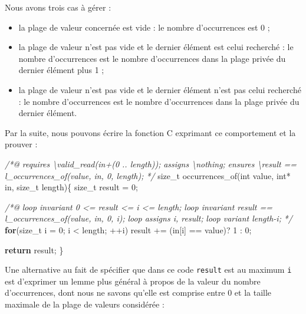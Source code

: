 \documentclass[12pt,francais,]{scrbook}
\newenvironment{Shaded}{}{}
\newcommand{\KeywordTok}[1]{\textcolor[rgb]{0.00,0.44,0.13}{\textbf{{#1}}}}
\newcommand{\DataTypeTok}[1]{\textcolor[rgb]{0.56,0.13,0.00}{{#1}}}
\newcommand{\DecValTok}[1]{\textcolor[rgb]{0.25,0.63,0.44}{{#1}}}
\newcommand{\CommentTok}[1]{\textcolor[rgb]{0.38,0.63,0.69}{\textit{{#1}}}}
\newcommand{\NormalTok}[1]{{#1}}
\providecommand{\tightlist}{%
  \setlength{\itemsep}{0pt}\setlength{\parskip}{0pt}}
\begin{document}
Nous avons trois cas à gérer :

\begin{itemize}
\tightlist
\item
  la plage de valeur concernée est vide : le nombre d'occurrences est 0
  ;
\item
  la plage de valeur n'est pas vide et le dernier élément est celui
  recherché : le nombre d'occurrences est le nombre d'occurrences dans
  la plage privée du dernier élément plus 1 ;
\item
  la plage de valeur n'est pas vide et le dernier élément n'est pas
  celui recherché : le nombre d'occurrences est le nombre d'occurrences
  dans la plage privée du dernier élément.
\end{itemize}

Par la suite, nous pouvons écrire la fonction C exprimant ce
comportement et la prouver :

\begin{footnotesize}\begin{Shaded}
\begin{Highlighting}[]
\CommentTok{/*@}
\CommentTok{  requires \textbackslash{}valid_read(in+(0 .. length));}
\CommentTok{  assigns  \textbackslash{}nothing;}
\CommentTok{  ensures  \textbackslash{}result == l_occurrences_of(value, in, 0, length);}
\CommentTok{*/}
\NormalTok{size_t occurrences_of(}\DataTypeTok{int} \NormalTok{value, }\DataTypeTok{int}\NormalTok{* in, size_t length)\{}
  \NormalTok{size_t result = }\DecValTok{0}\NormalTok{;}
  
  \CommentTok{/*@}
\CommentTok{    loop invariant 0 <= result <= i <= length;}
\CommentTok{    loop invariant result == l_occurrences_of(value, in, 0, i);}
\CommentTok{    loop assigns i, result;}
\CommentTok{    loop variant length-i;}
\CommentTok{  */}
  \KeywordTok{for}\NormalTok{(size_t i = }\DecValTok{0}\NormalTok{; i < length; ++i)}
    \NormalTok{result += (in[i] == value)? }\DecValTok{1} \NormalTok{: }\DecValTok{0}\NormalTok{;}

  \KeywordTok{return} \NormalTok{result;}
\NormalTok{\}}
\end{Highlighting}
\end{Shaded}\end{footnotesize}

Une alternative au fait de spécifier que dans ce code \texttt{result}
est au maximum \texttt{i} est d'exprimer un lemme plus général à propos
de la valeur du nombre d'occurrences, dont nous ne savons qu'elle est
comprise entre 0 et la taille maximale de la plage de valeurs considérée
:
\end{document}
